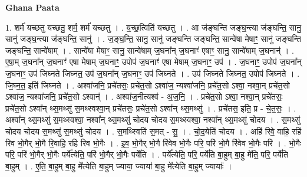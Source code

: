 \documentclass[17pt]{extarticle}
\begin{document}
\textbf{Ghana Paata } \newline

1. शर्म॑ यच्छतु यच्छतु॒ शर्म॒ शर्म॑ यच्छतु । . य॒च्छ॒त्विति॑ यच्छतु । . आ ज॑ङ्घन्ति जङ्घ॒न्त्या ज॑ङ्घन्ति॒ सानु॒ सानु॑ जङ्घ॒न्त्या ज॑ङ्घन्ति॒ सानु॑ । . ज॒ङ्घ॒न्ति॒ सानु॒ सानु॑ जङ्घन्ति जङ्घन्ति॒ सान्वे॑षा मेषाꣳ॒॒ सानु॑ जङ्घन्ति जङ्घन्ति॒ सान्वे॑षाम् । . सान्वे॑षा मेषाꣳ॒॒ सानु॒ सान्वे॑षाम् ज॒घना᳚न् ज॒घनाꣳ॑ एषाꣳ॒॒ सानु॒ सान्वे॑षाम् ज॒घनान्॑ । . ए॒षा॒म् ज॒घना᳚न् ज॒घनाꣳ॑ एषा मेषाम् ज॒घनाꣳ॒॒ उपोप॑ ज॒घनाꣳ॑ एषा मेषाम् ज॒घनाꣳ॒॒ उप॑ । . ज॒घनाꣳ॒॒ उपोप॑ ज॒घना᳚न् ज॒घनाꣳ॒॒ उप॑ जिघ्नते जिघ्नत॒ उप॑ ज॒घना᳚न् ज॒घनाꣳ॒॒ उप॑ जिघ्नते । . उप॑ जिघ्नते जिघ्नत॒ उपोप॑ जिघ्नते । . जि॒घ्न॒त॒ इति॑ जिघ्नते । . अश्वा॑जनि॒ प्रचे॑तसः॒ प्रचे॑त॒सो ऽश्वा॑ज॒ न्यश्वा॑जनि॒ प्रचे॑त॒सो ऽश्वा॒ नश्वा॒न् प्रचे॑त॒सो ऽश्वा॑ज॒ न्यश्वा॑जनि॒ प्रचे॑त॒सो ऽश्वान्॑ । . अश्वा॑ज॒नीत्यश्व॑ - अ॒ज॒नि॒ । . प्रचे॑त॒सो ऽश्वा॒ नश्वा॒न् प्रचे॑तसः॒ प्रचे॑त॒सो ऽश्वा᳚न् थ्स॒मथ्सु॑ स॒मथ्स्वश्वा॒न् प्रचे॑तसः॒ प्रचे॑त॒सो ऽश्वा᳚न् थ्स॒मथ्सु॑ । . प्रचे॑तस॒ इति॒ प्र - चे॒त॒सः॒ । . अश्वा᳚न् थ्स॒मथ्सु॑ स॒मथ्स्वश्वा॒ नश्वा᳚न् थ्स॒मथ्सु॑ चोदय चोदय स॒मथ्स्वश्वा॒ नश्वा᳚न् थ्स॒मथ्सु॑ चोदय । . स॒मथ्सु॑ चोदय चोदय स॒मथ्सु॑ स॒मथ्सु॑ चोदय । . स॒मथ्स्विति॑ स॒मत् - सु॒ । . चो॒द॒येति॑ चोदय । . अहि॑ रिवे॒ वाहि॒ रहि॑ रिव भो॒गैर् भो॒गै रि॒वाहि॒ रहि॑ रिव भो॒गैः । . इ॒व॒ भो॒गैर् भो॒गै रि॑वेव भो॒गैः परि॒ परि॑ भो॒गै रि॑वेव भो॒गैः परि॑ । . भो॒गैः परि॒ परि॑ भो॒गैर् भो॒गैः पर्ये᳚त्येति॒ परि॑ भो॒गैर् भो॒गैः पर्ये॑ति । . पर्ये᳚त्येति॒ परि॒ पर्ये॑ति बा॒हुम् बा॒हु मे॑ति॒ परि॒ पर्ये॑ति बा॒हुम् । . ए॒ति॒ बा॒हुम् बा॒हु मे᳚त्येति बा॒हुम् ज्याया॒ ज्याया॑ बा॒हु मे᳚त्येति बा॒हुम् ज्यायाः᳚ । \newline
\end{document}
